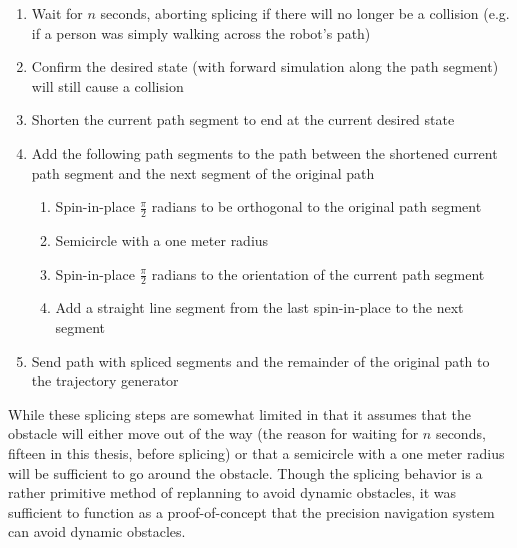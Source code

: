 \begin{enumerate}
\item Wait for $n$ seconds, aborting splicing if there will no longer be a collision (e.g. if a person was simply walking across the robot's path)
\item Confirm the desired state (with forward simulation along the path segment) will still cause a collision
\item Shorten the current path segment to end at the current desired state
\item Add the following path segments to the path between the shortened current path segment and the next segment of the original path
	\begin{enumerate}
	\item Spin-in-place $\frac{\pi}{2}$ radians to be orthogonal to the original path segment
	\item Semicircle with a one meter radius
	\item Spin-in-place $\frac{\pi}{2}$ radians to the orientation of the current path segment
	\item Add a straight line segment from the last spin-in-place to the next segment
	\end{enumerate}
\item Send path with spliced segments and the remainder of the original path to the trajectory generator
\end{enumerate}

While these splicing steps are somewhat limited in that it assumes that the obstacle will either move out of the way (the reason for waiting for $n$ seconds, fifteen in this thesis, before splicing) or that a semicircle with a one meter radius will be sufficient to go around the obstacle. Though the splicing behavior is a rather primitive method of replanning to avoid dynamic obstacles, it was sufficient to function as a proof-of-concept that the precision navigation system can avoid dynamic obstacles.

